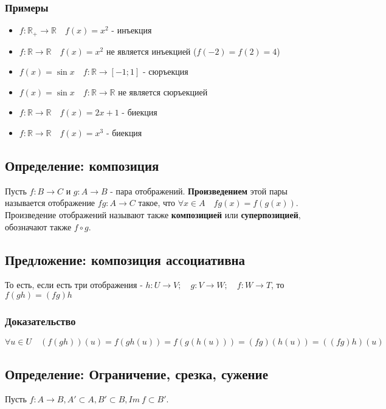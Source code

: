 \documentclass{article}
\begin{document}
\subsubsection*{Примеры}
\begin{itemize}
	\item $f: \mathbb{R}_+ \rightarrow \mathbb{R} \quad f(x) = x^2$ - инъекция
	\item $f: \mathbb{R} \rightarrow \mathbb{R} \quad f(x) = x^2$ не является инъекцией ($f(-2) = f(2) = 4$)
	\item $f(x) = \sin x \quad f: \mathbb{R} \rightarrow [-1; 1]$ - сюръекция
	\item $f(x) = \sin x \quad f: \mathbb{R} \rightarrow \mathbb{R}$ не является сюръекцией
	\item $f: \mathbb{R} \rightarrow \mathbb{R} \quad f(x) = 2x+1$ - биекция
	\item $f: \mathbb{R} \rightarrow \mathbb{R} \quad f(x) = x^3$ - биекция
\end{itemize}

\subsection{Определение: композиция}
Пусть $f: B \rightarrow C$ и $g: A \rightarrow B$ - пара отображений. \textbf{Произведением} этой пары называется отображение $fg: A \rightarrow C$ такое, что $\forall x \in A \quad fg(x) = f(g(x))$. Произведение отображений называют также \textbf{композицией} или \textbf{суперпозицией}, обозначают также $f \circ g$.

\subsection{Предложение: композиция ассоциативна}
То есть, если есть три отображения - $
	h: U \rightarrow V; \quad
	g: V \rightarrow W; \quad
	f: W \rightarrow T
$, то ${f(gh) = (fg)h}$

\subsubsection*{Доказательство}
\[
	\forall u \in U \quad (f(gh))(u) = f(gh(u)) = f(g(h(u))) = (fg)(h(u)) = ((fg)h)(u)
\]

\subsection{Определение: Ограничение, срезка, сужение}
Пусть $f: A \rightarrow B, A' \subset A, B' \subset B, Im~f \subset B'$.
\end{document}
